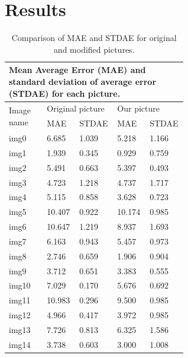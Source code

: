 \section{Results}

\begin{table}
    \caption{Comparison of MAE and STDAE for original and modified pictures.}
    \label{surveytable}
\begin{tabular}{|p{0.2\linewidth}|p{0.1\linewidth}|p{0.1\linewidth}|p{0.1\linewidth}|p{0.1\linewidth}|}
    \hline
    \multicolumn{5}{|p{0.7\linewidth}|}{\centering Mean Average Error (MAE) and standard deviation of average error (STDAE) for each picture.} \\
    \hline
    \multirow{2}{0.2\linewidth}{Image name} & \multicolumn{2}{|p{0.2\linewidth}|}{Original picture} & \multicolumn{2}{|p{0.2\linewidth}|}{Our picture} \\\cline{2-5}
    & MAE & STDAE & MAE & STDAE \\
    \hline
    img0 & 6.685 & 1.039 & 5.218 & 1.166 \\
    img1 & 1.939 & 0.345 & 0.929 & 0.759 \\
    img2 & 5.491 & 0.663 & 5.397 & 0.493 \\
    img3 & 4.723 & 1.218 & 4.737 & 1.717 \\
    img4 & 5.115 & 0.858 & 3.628 & 0.723 \\
    img5 & 10.407 & 0.922 & 10.174 & 0.985 \\
    img6 & 10.647 & 1.219 & 8.937 & 1.693 \\
    img7 & 6.163 & 0.943 & 5.457 & 0.973 \\
    img8 & 2.746 & 0.659 & 1.906 & 0.904 \\
    img9 & 3.712 & 0.651 & 3.383 & 0.555 \\
    img10 & 7.029 & 0.170 & 5.676 & 0.692 \\
    img11 & 10.983 & 0.296 & 9.500 & 0.985 \\
    img12 & 4.966 & 0.417 & 3.972 & 0.985 \\
    img13 & 7.726 & 0.813 & 6.325 & 1.586 \\
    img14 & 3.738 & 0.603 & 3.000 & 1.008 \\
    \hline
\end{tabular}
\end{table}

